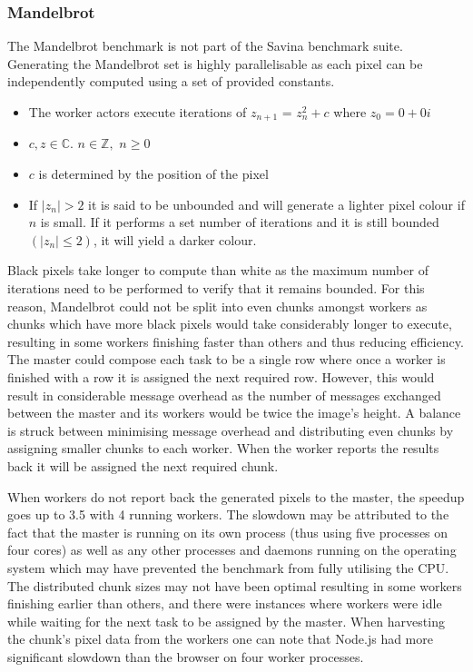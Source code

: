 \documentclass[oneside]{um-fict}
\begin{document}
\subsubsection{Mandelbrot}
The Mandelbrot benchmark is not part of the Savina benchmark suite. Generating the Mandelbrot set is highly parallelisable as each pixel can be independently computed using a set of provided constants. 
\begin{itemize}
    \item The worker actors execute iterations of $z_{n+1}$ = $z_{n}^{2}+c$ where $z_0 = 0 + 0i$
    \item $c, z \in \mathbb{C}$. $n \in \mathbb{Z},$ $n \ge 0$
    \item $c$ is determined by the position of the pixel
    \item If $|z_n|> 2$ it is said to be unbounded and will generate a lighter pixel colour if $n$ is small. If it performs a set number of iterations and it is still bounded $(|z_n| \le 2)$, it will yield a darker colour.
\end{itemize}
Black pixels take longer to compute than white as the maximum number of iterations need to be performed to verify that it remains bounded. For this reason, Mandelbrot could not be split into even chunks amongst workers as chunks which have more black pixels would take considerably longer to execute, resulting in some workers finishing faster than others and thus reducing efficiency. The master could compose each task to be a single row where once a worker is finished with a row it is assigned the next required row. However, this would result in considerable message overhead as the number of messages exchanged between the master and its workers would be twice the image's height. A balance is struck between minimising message overhead and distributing even chunks by assigning smaller chunks to each worker. When the worker reports the results back it will be assigned the next required chunk.

When workers do not report back the generated pixels to the master, the speedup goes up to 3.5 with 4 running workers. The slowdown may be attributed to the fact that the master is running on its own process (thus using five processes on four cores) as well as any other processes and daemons running on the operating system which may have prevented the benchmark from fully utilising the CPU. The distributed chunk sizes may not have been optimal resulting in some workers finishing earlier than others, and there were instances where workers were idle while waiting for the next task to be assigned by the master. When harvesting the chunk's pixel data from the workers one can note that Node.js had more significant slowdown than the browser on four worker processes.
\end{document}
